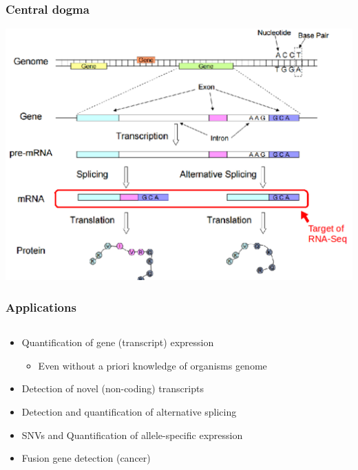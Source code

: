\documentclass{beamer}			  %
\begin{document}
\begin{frame}
	\frametitle{Central dogma}
	\begin{center}
		\includegraphics[height=0.8\textheight]{figures/dge_00bp.png}
	\end{center}
\end{frame}

\begin{frame}
\frametitle{Applications}
  \begin{columns}[T]
	\begin{column}{.62\textwidth}
	\begin{itemize}
		\item Quantification of gene (transcript) expression
		\begin{itemize}
			\item Even without a priori knowledge of organisms genome
		\end{itemize}
		\item Detection of novel (non-coding) transcripts
		\item Detection and quantification of alternative splicing
		\item SNVs and Quantification of allele-specific expression
		\item Fusion gene detection (cancer)
	\end{itemize}
	\end{column}
  \end{columns}
\end{frame}
\end{document}
